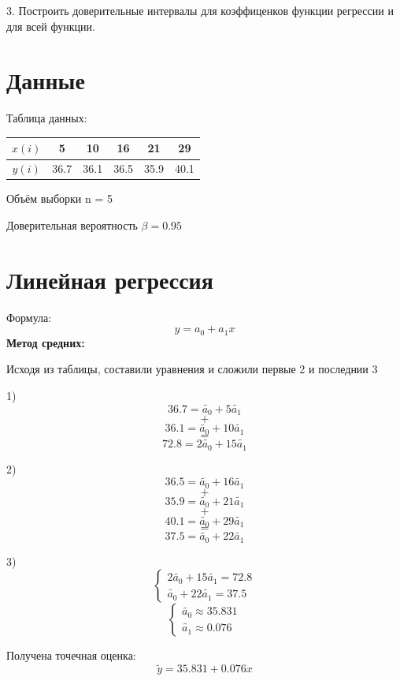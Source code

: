 \documentclass{article}
\begin{document}
3. Построить доверительные интервалы для коэффиценков функции регрессии и для всей функции.
\section*{Данные }
Таблица данных:

\begin{table}[H]
    \centering
    \begin{tabular}{|c|c|c|c|c|c|}
    \hline
    $x(i)$&  5&  10&  16& 21& 29\\
    \hline
    $y(i)$&  36.7&  36.1&  36.5& 35.9& 40.1\\
    \hline
    \end{tabular}
\end{table}

Объём выборки n = 5

Доверительная вероятность $\beta = 0.95$

\section*{Линейная регрессия}
Формула:
\[y = a_0 + a_1x\]
\textbf{Метод средних:}

Исходя из таблицы, составили уравнения и сложили первые 2 и последнии 3

1)
\[36.7 = \tilde{a_0} + 5 \tilde{a_1}\]
\[+\]
\[36.1 = \tilde{a_0} + 10 \tilde{a_1}\]
\[=\]
\[72.8 = 2\tilde{a_0} + 15\tilde{a_1}\]

2)
\[36.5 = \tilde{a_0} + 16 \tilde{a_1}\]
\[+\]
\[35.9 = \tilde{a_0} + 21 \tilde{a_1}\]
\[+\]
\[40.1 = \tilde{a_0} + 29 \tilde{a_1}\]
\[=\]
\[37.5 = \tilde{a_0} + 22 \tilde{a_1}\]

3)
\[\begin{cases}
    2\tilde{a_0} + 15\tilde{a_1} = 72.8 \\
     \tilde{a_0} + 22 \tilde{a_1} = 37.5 
\end{cases}\]
\[\begin{cases}
    \tilde{a_0} \approx 35.831\\
    \tilde{a_1} \approx 0.076
\end{cases}\]

Получена точечная оценка:
\[\tilde{y} = 35.831 + 0.076x\]
\end{document}
